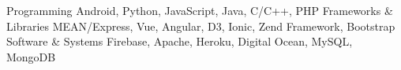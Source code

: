 \begin{cvskills}
  \cvskill
    {Programming}
    {Android, Python, JavaScript, Java, C/C++, PHP}
  \cvskill
  {Frameworks \& Libraries}
  {MEAN/Express, Vue, Angular, D3, Ionic, Zend Framework, Bootstrap}  
  \cvskill
  {Software \& Systems}
  {Firebase, Apache, Heroku, Digital Ocean, MySQL, MongoDB}      
\end{cvskills}